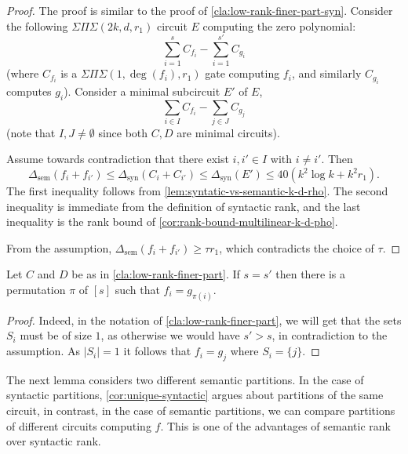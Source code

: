 \documentclass[12pt]{article}
\newcommand{\SumProdSum}{\Sigma \Pi \Sigma}
\newcommand{\ranksyn}{\Delta_{\text{syn}}}
\newcommand{\ranksem}{\Delta_{\text{sem}}}
\begin{document}
	\begin{proof}
		The proof is similar to the proof of  \autoref{cla:low-rank-finer-part-syn}.	
		Consider the following $\SumProdSum(2k,d,r_1)$ circuit $E$ computing the zero polynomial:
		\[
		\sum_{i=1}^s C_{f_i} - \sum_{i=1}^{s'} C_{g_i}
		\]
		(where $C_{f_i}$ is a $\SumProdSum(1,\deg(f_i),r_1)$ gate computing $f_i$, and similarly $C_{g_i}$ computes $g_i$).
		Consider a minimal subcircuit $E'$ of $E$,
		\[
		\sum_{i \in I} C_{f_i} - \sum_{j \in J} C_{g_j}
		\]
		(note that $I, J \neq \emptyset$ since both $C,D$ are minimal circuits).
		
		Assume towards contradiction that there exist $i,i' \in I$ with $i \neq i'$. Then
		\[
		\ranksem(f_i + f_{i'}) \le \ranksyn(C_{i} + C_{{i'}}) \le \ranksyn(E') \le 40 (k^2 \log k + k^2 r_1).
		\]
		The first inequality follows from \autoref{lem:syntatic-vs-semantic-k-d-rho}. The second inequality is immediate from the definition of syntactic rank, and the last inequality is the rank bound of \autoref{cor:rank-bound-multilinear-k-d-pho}.  
		
		From the assumption, $\ranksem(f_i + f_{i'}) \ge \tau r_1$, which contradicts the choice of $\tau$.
	\end{proof}
	
	
	\begin{corollary}\label{cor:same-num-semantic}
		Let $C$ and $D$ be as in \autoref{cla:low-rank-finer-part}. If $s=s'$ then there is a permutation $\pi$ of $[s]$ such that $f_i=g_{\pi(i)}$.
	\end{corollary}
	
	\begin{proof}
		Indeed, in the notation of \autoref{cla:low-rank-finer-part}, we will get that the sets $S_i$ must be of size $1$, as otherwise we would have $s'>s$, in contradiction to the assumption. As $|S_i|=1$ it follows that $f_i=g_j$ where $S_i=\{j\}$.
	\end{proof}
	
	
	The next lemma considers two different semantic partitions. In the case of syntactic partitions, \autoref{cor:unique-syntactic} argues about partitions of the same circuit, in contrast, in the case of semantic partitions, we can compare partitions of different circuits computing $f$. This is one of the advantages of semantic rank over syntactic rank.
	
\end{document}

